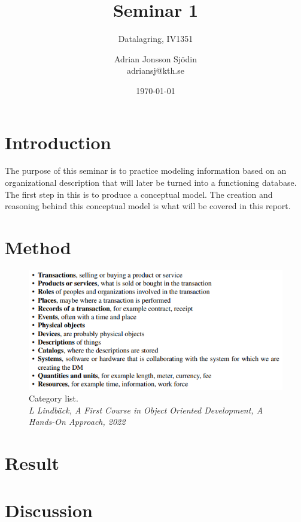 \documentclass[a4paper]{scrreprt}
\title{Seminar 1}
\subtitle{Datalagring, IV1351}
\author{Adrian Jonsson Sjödin \\ adriansj@kth.se}
\date{\today}
\begin{document}
\maketitle

\tableofcontents %

\chapter{Introduction}
The purpose of this seminar is to practice modeling information based on an organizational description that will later be turned into a functioning database. The first
step in this is to produce a conceptual model. The creation and reasoning behind this conceptual model is what will be covered in this report.

\chapter{Method}



\begin{figure}[h]
    \begin{center}
        \includegraphics[scale = 1.0 ]{../img/CategoryList.PNG}
        \caption{Category list. \\ \textit{L Lindbäck, A First Course in Object Oriented Development, A Hands-On Approach, 2022}}
        \label{fig:categoryList}
    \end{center}
\end{figure}



\chapter{Result}
\label{sec:result}




\chapter{Discussion}
\end{document}
